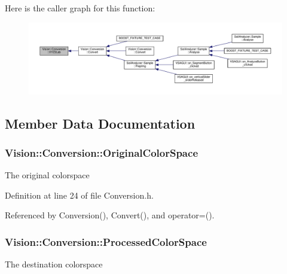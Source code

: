 Here is the caller graph for this function\+:\nopagebreak
\begin{figure}[H]
\begin{center}
\leavevmode
\includegraphics[width=350pt]{class_vision_1_1_conversion_a9ecc41c4226eafc55d0ee0cc550e593b_icgraph}
\end{center}
\end{figure}




\subsection{Member Data Documentation}
\hypertarget{class_vision_1_1_conversion_a3fd4bac8a8d6788b6a1886916c5464b4}{}
\subsubsection[{Original\+Color\+Space}]{ Vision\+::\+Conversion\+::\+Original\+Color\+Space}\label{class_vision_1_1_conversion_a3fd4bac8a8d6788b6a1886916c5464b4}
The original colorspace 

Definition at line 24 of file Conversion.\+h.



Referenced by Conversion(), Convert(), and operator=().

\hypertarget{class_vision_1_1_conversion_a57337750cb60b9ff7ed269c184d1fda7}{}
\subsubsection[{Processed\+Color\+Space}]{ Vision\+::\+Conversion\+::\+Processed\+Color\+Space}\label{class_vision_1_1_conversion_a57337750cb60b9ff7ed269c184d1fda7}
The destination colorspace 

